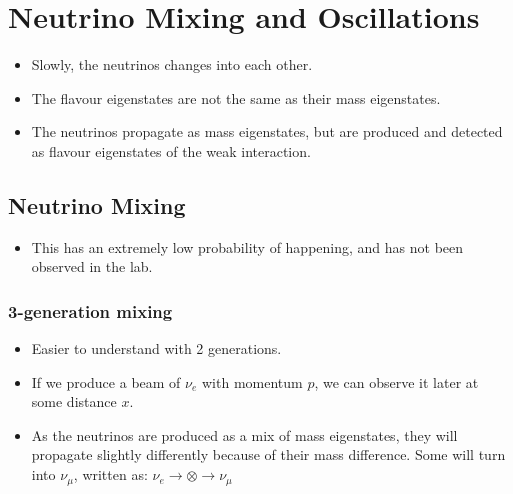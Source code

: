 \section{Neutrino Mixing and Oscillations}
\begin{itemize}
  \item Slowly, the neutrinos changes into each other. 
  \item The flavour eigenstates are not the same as their mass eigenstates. 
  \item The neutrinos propagate as mass eigenstates, but are produced and detected as flavour eigenstates of the weak interaction. 
\end{itemize}

\subsection{Neutrino Mixing}
\begin{itemize}
  \item This has an extremely low probability of happening, and has not been observed in the lab.
\end{itemize}
\subsubsection{3-generation mixing}
\begin{itemize}
  \item Easier to understand with 2 generations.
  \item If we produce a beam of $ν_e$ with momentum $p$, we can observe it later at some distance $x$. 
  \item As the neutrinos are produced as a mix of mass eigenstates, they will propagate slightly differently because of their mass difference. Some will turn into $ν_μ$, written as: $ν_e →  ⊗  → ν_{μ}$
\end{itemize}

